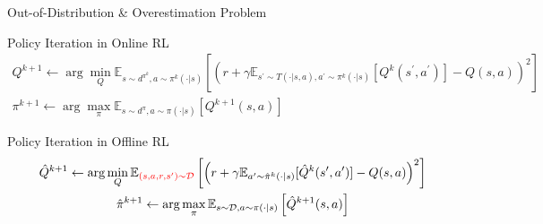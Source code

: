 \documentclass[11pt]{beamer}
\newcommand{\mbb}[1]{\mathbb{#1}}
\newcommand{\mc}[1]{\mathcal{#1}}
\begin{document}
\begin{frame}{Out-of-Distribution \& Overestimation Problem}
    \begin{block}{Policy Iteration in Online RL}
    \[
    \begin{gathered}
        Q^{k+1} \leftarrow \arg \min_Q \mbb{E}_{s \sim d^{\pi^k}, a \sim {\pi}^k(\cdot|s)}\left[ \left( r+ \gamma \mbb{E}_{s^\prime \sim T(\cdot|s,a), a^\prime \sim \pi^k(\cdot|s)}[Q^k(s^\prime, a^\prime)] - Q(s,a)\right)^2\right] \\
        \pi^{k+1} \leftarrow \arg \max_\pi \mbb{E}_{s \sim d^\pi, a \sim \pi(\cdot|s)} \left[ Q^{k+1}(s,a)\right]
    \end{gathered}
    \]
    \end{block}
    \begin{block}{Policy Iteration in Offline RL}
        \[
        \begin{gathered}
            \hat{Q}^{k+1} \leftarrow \arg \min_Q \mbb{E}_{\textcolor{red}{(s,a,r, s^\prime) \sim \mc{D}}} \left[ \left(r + \gamma \mbb{E}_{a^\prime \sim \hat{\pi}^k (\cdot|s)}  [\hat{Q}^{k}(s^\prime,a^\prime)] - Q(s,a)\right)^2 \right] \\
            \hat{\pi}^{k+1} \leftarrow \arg \max_\pi \mbb{E}_{s\sim \mc{D}, a \sim \pi(\cdot|s)} \left[ \hat{Q}^{k+1}(s,a)\right]
        \end{gathered}
        \]
    \end{block}



\end{frame}
\end{document}
